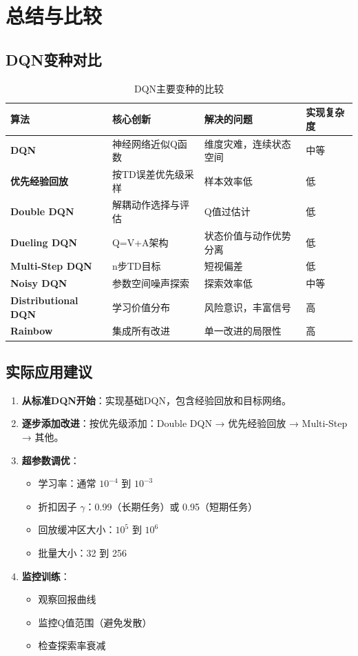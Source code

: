 \section{总结与比较}

\subsection{DQN变种对比}

\begin{table}[H]
\centering
\caption{DQN主要变种的比较}
\begin{tabular}{p{}p{}p{}p{}}
\toprule
\textbf{算法} & \textbf{核心创新} & \textbf{解决的问题} & \textbf{实现复杂度} \\
\midrule
\textbf{DQN} & 神经网络近似Q函数 & 维度灾难，连续状态空间 & 中等 \\
\textbf{优先经验回放} & 按TD误差优先级采样 & 样本效率低 & 低 \\
\textbf{Double DQN} & 解耦动作选择与评估 & Q值过估计 & 低 \\
\textbf{Dueling DQN} & Q=V+A架构 & 状态价值与动作优势分离 & 低 \\
\textbf{Multi-Step DQN} & n步TD目标 & 短视偏差 & 低 \\
\textbf{Noisy DQN} & 参数空间噪声探索 & 探索效率低 & 中等 \\
\textbf{Distributional DQN} & 学习价值分布 & 风险意识，丰富信号 & 高 \\
\textbf{Rainbow} & 集成所有改进 & 单一改进的局限性 & 高 \\
\bottomrule
\end{tabular}
\end{table}

\subsection{实际应用建议}

\begin{enumerate}
    \item \textbf{从标准DQN开始}：实现基础DQN，包含经验回放和目标网络。
    \item \textbf{逐步添加改进}：按优先级添加：Double DQN → 优先经验回放 → Multi-Step → 其他。
    \item \textbf{超参数调优}：
    \begin{itemize}
        \item 学习率：通常 $10^{-4}$ 到 $10^{-3}$
        \item 折扣因子 $\gamma$：0.99（长期任务）或 0.95（短期任务）
        \item 回放缓冲区大小：$10^5$ 到 $10^6$
        \item 批量大小：32 到 256
    \end{itemize}
    \item \textbf{监控训练}：
    \begin{itemize}
        \item 观察回报曲线
        \item 监控Q值范围（避免发散）
        \item 检查探索率衰减
    \end{itemize}
\end{enumerate}

